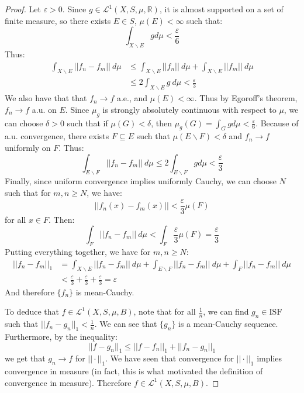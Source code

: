 \documentclass[a4paper,12pt]{report}
\newcommand{\ms}[1]{\mathscr{#1}}
\newcommand{\varep}{ \varepsilon }
\newcommand{\sse} {\subseteq}
\newcommand{\bs} {\backslash}
\begin{document}
	\begin{proof}
	Let $\varep > 0$. Since $g \in \ms{L}^1(X, S, \mu, \mathbb{R})$, it is almost supported on a set of finite measure, so there exists $E \in S$, $\mu(E) < \infty$ such that:
	\[ \int_{X \bs E} g d\mu < \frac{\varep}{6} \]
	Thus:
	\begin{align*}
	\int_{X \bs E} ||f_n - f_m|| ~ d\mu &\leq \int_{X \bs E} ||f_n|| ~ d\mu + \int_{X \bs E} ||f_m|| ~ d\mu \\
	&\leq 2 \int_{X \bs E} g ~ d\mu < \frac{\varep}{3} 
	\end{align*}
	We also have that that $f_n \rightarrow f$ a.e., and $\mu(E) < \infty$. Thus by Egoroff's theorem, $f_n \rightarrow f$ a.u. on $E$. Since $\mu_g$ is strongly absolutely continuous with respect to $\mu$, we can choose $\delta > 0$ such that if $\mu(G) < \delta$, then $\mu_g(G) = \int_G g d\mu < \frac{\varep}{6}$. Because of a.u. convergence, there exists $F \sse E$ such that $\mu(E \bs F) < \delta$ and $f_n \rightarrow f$ uniformly on $F$. Thus:
	\[ \int_{E \bs F} ||f_n - f_m|| ~ d\mu \leq 2 \int_{E \bs F} g d\mu < \frac{\varep}{3} \]
	Finally, since uniform convergence implies uniformly Cauchy, we can choose $N$ such that for $m, n \geq N$, we have:
	\[ ||f_n(x) - f_m(x)|| < \frac{\varep}{3} \mu(F) \]
	for all $x \in F$. Then:
	\[ \int_F ||f_n - f_m|| ~ d\mu < \int_F \frac{\varep}{3} \mu(F) = \frac{\varep}{3} \]
	Putting everything together, we have for $m, n \geq N$:
	\begin{align*}
	||f_n - f_m||_1 &= \int_{X \bs E} ||f_n - f_m|| ~ d\mu + \int_{E \bs F} ||f_n - f_m|| ~ d\mu + \int_{F} ||f_n - f_m|| ~ d\mu \\
	&< \frac{\varep}{3} + \frac{\varep}{3} + \frac{\varep}{3} = \varep
	\end{align*}
	And therefore $\{f_n\}$ is mean-Cauchy.
	
	To deduce that $f \in \ms{L}^1(X, S, \mu, B)$, note that for all $\frac{1}{n}$, we can find $g_n \in \text{ISF}$ such that $||f_n - g_n||_1 < \frac{1}{n}$. We can see that $\{g_n\}$ is a mean-Cauchy sequence. Furthermore, by the inequality:
	\[ ||f - g_n||_1 \leq ||f - f_n||_1 + ||f_n - g_n||_1 \]
	we get that $g_n \rightarrow f$ for $||\cdot||_1$. We have seen that convergence for $||\cdot||_1$ implies convergence in measure (in fact, this is what motivated the definition of convergence in measure). Therefore $f \in \ms{L}^1(X, S, \mu, B)$. 
	\end{proof}
	
\end{document}
